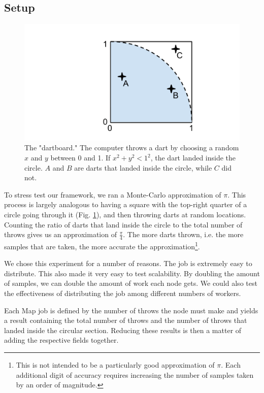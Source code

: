 \documentclass[10pt, conference, compsocconf]{IEEEtran}
\begin{document}
\subsection{Setup}

\begin{figure}
    \includegraphics[width=\linewidth]{dartboard}
    \caption{The "dartboard." The computer throws a dart by choosing a random $x$ and $y$ between 0 and 1.  If $x^{2} + y^{2} < 1^{2} $, the dart landed inside the circle.  $A$ and $B$ are darts that landed inside the circle, while $C$ did not.}
    \label{dartboard}
\end{figure}

To stress test our framework, we ran a Monte-Carlo approximation of $\pi$. This process is largely analogous to having a square with the top-right quarter of a circle going through it (Fig. \ref{dartboard}), and then throwing darts at random locations.  Counting the ratio of darts that land inside the circle to the total number of throws gives us an approximation of $\frac{\pi}{4}$.  The more darts thrown, i.e. the more samples that are taken, the more accurate the approximation\footnote{This is not intended to be a particularly good approximation of $\pi$. Each additional digit of accuracy requires increasing the number of samples taken by an order of magnitude.}.

We chose this experiment for a number of reasons. The job is extremely easy to distribute.  This also made it very easy to test scalability. By doubling the amount of samples, we can double the amount of work each node gets.  We could also test the effectiveness of distributing the job among different numbers of workers.

Each Map job is defined by the number of throws the node must make and yields a result containing the total number of throws and the number of throws that landed inside the circular section.  Reducing these results is then a matter of adding the respective fields together. 
\end{document}
